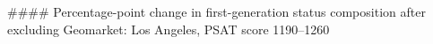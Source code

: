 #### Percentage-point change in first-generation status composition after excluding Geomarket: Los Angeles, PSAT score 1190–1260

